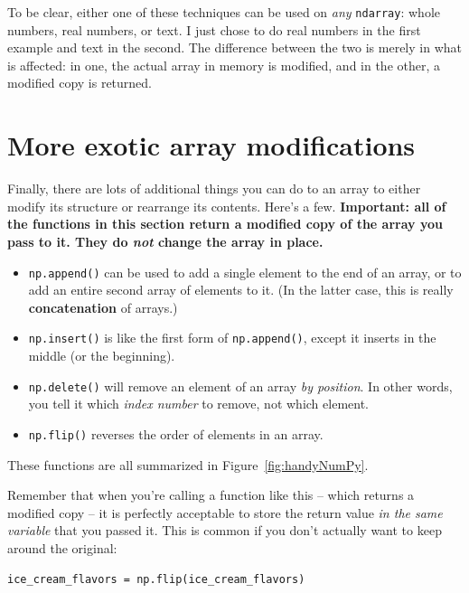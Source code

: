 To be clear, either one of these techniques can be used on \textit{any}
\texttt{ndarray}: whole numbers, real numbers, or text. I just chose to do real
numbers in the first example and text in the second. The difference between the
two is merely in what is affected: in one, the actual array in memory is
modified, and in the other, a modified copy is returned.

\section{More exotic array modifications}

Finally, there are lots of additional things you can do to an array to either
modify its structure or rearrange its contents. Here's a few.
\textbf{Important: all of the functions in this section return a modified copy
of the array you pass to it. They do \textit{not} change the array in place.}

\begin{itemize}
\itemsep.1em
\item \texttt{np.append()} can be used to add a single element to the end of an
array, or to add an entire second array of elements to it. (In the latter case,
this is really \textbf{concatenation} of arrays.)
\item \texttt{np.insert()} is like the first form of \texttt{np.append()},
except it inserts in the middle (or the beginning).
\item \texttt{np.delete()} will remove an element of an array \textit{by
position}. In other words, you tell it which \textit{index number} to remove,
not which element.
\item \texttt{np.flip()} reverses the order of elements in an array.
\end{itemize}

These functions are all summarized in Figure~\ref{fig:handyNumPy}.

Remember that when you're calling a function like this -- which returns a
modified copy -- it is perfectly acceptable to store the return value
\textit{in the same variable} that you passed it. This is common if you don't
actually want to keep around the original:

\begin{Verbatim}[fontsize=\small,samepage=true,frame=single,framesep=3mm]
ice_cream_flavors = np.flip(ice_cream_flavors)
\end{Verbatim}


